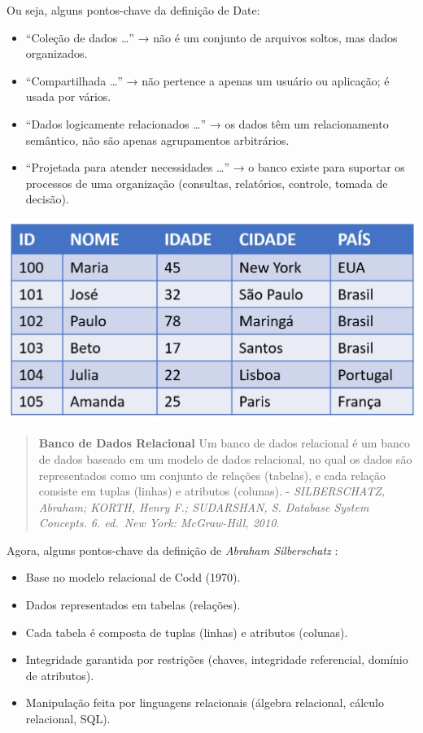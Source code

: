 \documentclass[
]{book}
\begin{document}
Ou seja, alguns pontos-chave da definição de Date:

\begin{itemize}
\item
  ``Coleção de dados \ldots{}'' → não é um conjunto de arquivos soltos, mas dados organizados.
\item
  ``Compartilhada \ldots{}'' → não pertence a apenas um usuário ou aplicação; é usada por vários.
\item
  ``Dados logicamente relacionados \ldots{}'' → os dados têm um relacionamento semântico, não são apenas agrupamentos arbitrários.
\item
  ``Projetada para atender necessidades \ldots{}'' → o banco existe para suportar os processos de uma organização (consultas, relatórios, controle, tomada de decisão).
\end{itemize}

\includegraphics{images/5-bi/07-tabela_relacional.jpg}

\begin{quote}
\textbf{Banco de Dados Relacional} Um banco de dados relacional é um banco de dados baseado em um modelo de dados relacional, no qual os dados são representados como um conjunto de relações (tabelas), e cada relação consiste em tuplas (linhas) e atributos (colunas). - \emph{SILBERSCHATZ, Abraham; KORTH, Henry F.; SUDARSHAN, S. Database System Concepts. 6. ed.~New York: McGraw-Hill, 2010.}
\end{quote}

Agora, alguns pontos-chave da definição de \emph{Abraham Silberschatz} :

\begin{itemize}
\item
  Base no modelo relacional de Codd (1970).
\item
  Dados representados em tabelas (relações).
\item
  Cada tabela é composta de tuplas (linhas) e atributos (colunas).
\item
  Integridade garantida por restrições (chaves, integridade referencial, domínio de atributos).
\item
  Manipulação feita por linguagens relacionais (álgebra relacional, cálculo relacional, SQL).
\end{itemize}
\end{document}

